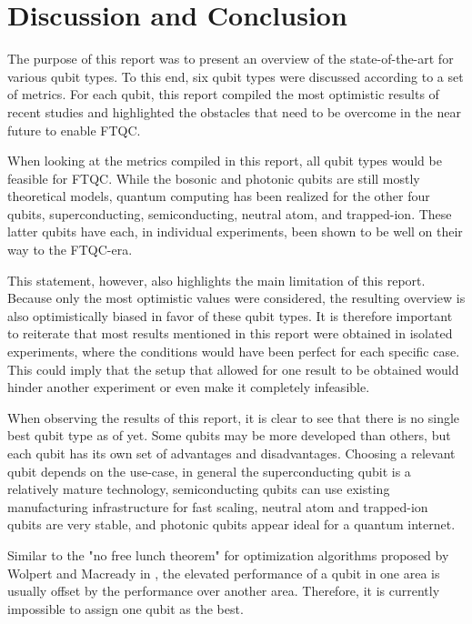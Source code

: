 \section{Discussion and Conclusion}
\label{section: conclusion}


%   

The purpose of this report was to present an overview of the state-of-the-art for various qubit types. To this end, six qubit types were discussed according to a set of metrics. For each qubit, this report compiled the most optimistic results of recent studies and highlighted the obstacles that need to be overcome in the near future to enable FTQC.

When looking at the metrics compiled in this report, all qubit types would be feasible for FTQC. While the bosonic and photonic qubits are still mostly theoretical models, quantum computing has been realized for the other four qubits, superconducting, semiconducting, neutral atom, and trapped-ion.
These latter qubits have each, in individual experiments, been shown to be well on their way to the FTQC-era.

This statement, however, also highlights the main limitation of this report. Because only the most optimistic values were considered, the resulting overview is also optimistically biased in favor of these qubit types. It is therefore important to reiterate that most results mentioned in this report were obtained in isolated experiments, where the conditions would have been perfect for each specific case.
This could imply that the setup that allowed for one result to be obtained would hinder another experiment or even make it completely infeasible.

When observing the results of this report, it is clear to see that there is no single best qubit type as of yet. Some qubits may be more developed than others, but each qubit has its own set of advantages and disadvantages.
Choosing a relevant qubit depends on the use-case, in general the superconducting qubit is a relatively mature technology, semiconducting qubits can use existing manufacturing infrastructure for fast scaling, neutral atom and trapped-ion qubits are very stable, and photonic qubits appear ideal for a quantum internet.

Similar to the "no free lunch theorem" for optimization algorithms proposed by Wolpert and Macready in \cite{Wolpert_1997}, the elevated performance of a qubit in one area is usually offset by the performance over another area. Therefore, it is currently impossible to assign one qubit as the best.
